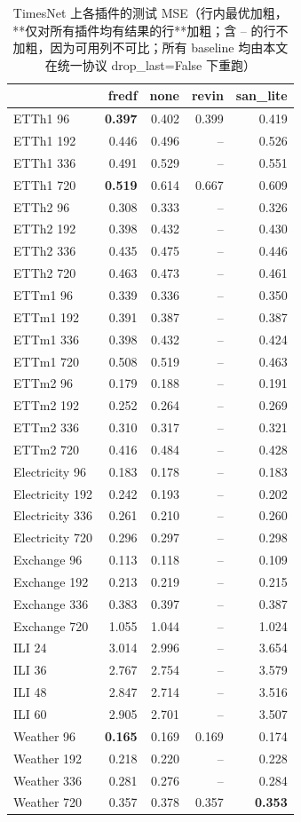 \begin{table}[htbp]
\centering
\small
\caption{TimesNet 上各插件的测试 MSE（行内最优加粗，**仅对所有插件均有结果的行**加粗；含 -- 的行不加粗，因为可用列不可比；所有 baseline 均由本文在统一协议 drop\_last=False 下重跑）}
\label{tab:main_timesnet}
\begin{tabular}{lrrrr}
\toprule
 & fredf & none & revin & san\_lite \\
\midrule
ETTh1 96 & \textbf{0.397} & 0.402 & 0.399 & 0.419 \\
ETTh1 192 & 0.446 & 0.496 & -- & 0.526 \\
ETTh1 336 & 0.491 & 0.529 & -- & 0.551 \\
ETTh1 720 & \textbf{0.519} & 0.614 & 0.667 & 0.609 \\
ETTh2 96 & 0.308 & 0.333 & -- & 0.326 \\
ETTh2 192 & 0.398 & 0.432 & -- & 0.430 \\
ETTh2 336 & 0.435 & 0.475 & -- & 0.446 \\
ETTh2 720 & 0.463 & 0.473 & -- & 0.461 \\
ETTm1 96 & 0.339 & 0.336 & -- & 0.350 \\
ETTm1 192 & 0.391 & 0.387 & -- & 0.387 \\
ETTm1 336 & 0.398 & 0.432 & -- & 0.424 \\
ETTm1 720 & 0.508 & 0.519 & -- & 0.463 \\
ETTm2 96 & 0.179 & 0.188 & -- & 0.191 \\
ETTm2 192 & 0.252 & 0.264 & -- & 0.269 \\
ETTm2 336 & 0.310 & 0.317 & -- & 0.321 \\
ETTm2 720 & 0.416 & 0.484 & -- & 0.428 \\
Electricity 96 & 0.183 & 0.178 & -- & 0.183 \\
Electricity 192 & 0.242 & 0.193 & -- & 0.202 \\
Electricity 336 & 0.261 & 0.210 & -- & 0.260 \\
Electricity 720 & 0.296 & 0.297 & -- & 0.298 \\
Exchange 96 & 0.113 & 0.118 & -- & 0.109 \\
Exchange 192 & 0.213 & 0.219 & -- & 0.215 \\
Exchange 336 & 0.383 & 0.397 & -- & 0.387 \\
Exchange 720 & 1.055 & 1.044 & -- & 1.024 \\
ILI 24 & 3.014 & 2.996 & -- & 3.654 \\
ILI 36 & 2.767 & 2.754 & -- & 3.579 \\
ILI 48 & 2.847 & 2.714 & -- & 3.516 \\
ILI 60 & 2.905 & 2.701 & -- & 3.507 \\
Weather 96 & \textbf{0.165} & 0.169 & 0.169 & 0.174 \\
Weather 192 & 0.218 & 0.220 & -- & 0.228 \\
Weather 336 & 0.281 & 0.276 & -- & 0.284 \\
Weather 720 & 0.357 & 0.378 & 0.357 & \textbf{0.353} \\
\bottomrule
\end{tabular}
\end{table}

